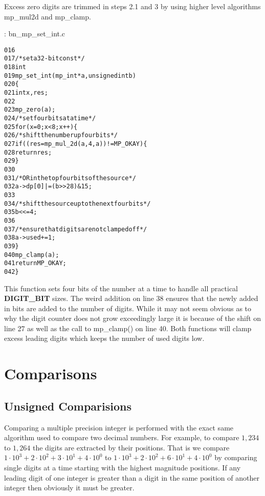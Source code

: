 \documentclass[b5paper]{book}
\begin{document}
Excess zero digits are trimmed in steps 2.1 and 3 by using higher level algorithms mp\_mul2d and mp\_clamp.

\vspace{+3mm}\begin{small}
\hspace{-5.1mm}{\bf File}: bn\_mp\_set\_int.c
\vspace{-3mm}
\begin{alltt}
016   
017   /* set a 32-bit const */
018   int
019   mp_set_int (mp_int * a, unsigned int b)
020   \{
021     int     x, res;
022   
023     mp_zero (a);
024     /* set four bits at a time */
025     for (x = 0; x < 8; x++) \{
026       /* shift the number up four bits */
027       if ((res = mp_mul_2d (a, 4, a)) != MP_OKAY) \{
028         return res;
029       \}
030   
031       /* OR in the top four bits of the source */
032       a->dp[0] |= (b >> 28) & 15;
033   
034       /* shift the source up to the next four bits */
035       b <<= 4;
036   
037       /* ensure that digits are not clamped off */
038       a->used += 1;
039     \}
040     mp_clamp (a);
041     return MP_OKAY;
042   \}
\end{alltt}
\end{small}

This function sets four bits of the number at a time to handle all practical \textbf{DIGIT\_BIT} sizes.  The weird
addition on line 38 ensures that the newly added in bits are added to the number of digits.  While it may not 
seem obvious as to why the digit counter does not grow exceedingly large it is because of the shift on line 27 
as well as the  call to mp\_clamp() on line 40.  Both functions will clamp excess leading digits which keeps 
the number of used digits low.

\section{Comparisons}
\subsection{Unsigned Comparisions}
Comparing a multiple precision integer is performed with the exact same algorithm used to compare two decimal numbers.  For example,
to compare $1,234$ to $1,264$ the digits are extracted by their positions.  That is we compare $1 \cdot 10^3 + 2 \cdot 10^2 + 3 \cdot 10^1 + 4 \cdot 10^0$
to $1 \cdot 10^3 + 2 \cdot 10^2 + 6 \cdot 10^1 + 4 \cdot 10^0$ by comparing single digits at a time starting with the highest magnitude 
positions.  If any leading digit of one integer is greater than a digit in the same position of another integer then obviously it must be greater.  
\end{document}
